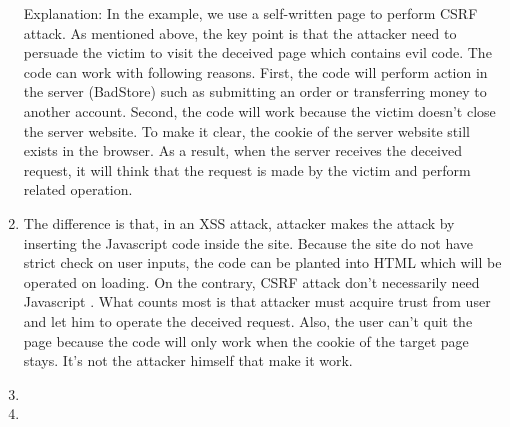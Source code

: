 \begin{enumerate}
	\indent Explanation: In the example, we use a self-written page to perform CSRF attack. As mentioned above, the key point is that the attacker need to persuade the victim to visit the deceived page which contains evil code. The code can work with following reasons. First, the code will perform action in the server (BadStore) such as submitting an order or transferring money to another account. Second, the code will work because the victim doesn't close the server website. To make it clear, the cookie of the server website still exists in the browser. As a result, when the server receives the deceived request, it will think that the request is made by the victim and perform related operation.
	\item The difference is that, in an XSS attack, attacker makes the attack by inserting the  Javascript code inside the site. Because the site do not have strict check on user inputs, the code can be planted into HTML which will be operated on loading. On the contrary, CSRF attack don't necessarily need Javascript \cite{website:wikipedia_CSRF_XSS}. What counts most is that attacker must acquire trust from user and let him to operate the deceived request. Also, the user can't quit the page because the code will only work when the cookie of the target page stays. It's not the attacker himself that make it work.

\item \highergradesonly
\item \highergradesonly
\end{enumerate}
